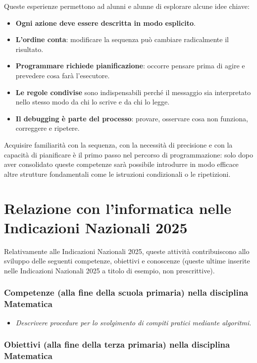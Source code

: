 Queste esperienze permettono ad alunni e alunne di esplorare alcune idee chiave:

\begin{itemize}
\item
  \textbf{Ogni azione deve essere descritta in modo esplicito}.
\item
  \textbf{L'ordine conta}: modificare la sequenza può cambiare radicalmente il risultato.
\item
  \textbf{Programmare richiede pianificazione}: occorre pensare prima di agire e prevedere cosa farà l'esecutore.
\item
  \textbf{Le regole condivise} sono indispensabili perché il messaggio sia interpretato nello stesso modo da chi lo scrive e da chi lo legge.
\item
  \textbf{Il debugging è parte del processo}: provare, osservare cosa non funziona, correggere e ripetere.
\end{itemize}

Acquisire familiarità con la sequenza, con la necessità di precisione e con la capacità di pianificare è il primo passo nel percorso di programmazione: solo dopo aver consolidato queste competenze sarà possibile introdurre in modo efficace altre strutture fondamentali come le istruzioni condizionali o le ripetizioni.

\section{Relazione con l'informatica nelle Indicazioni Nazionali 2025 }\label{relazione-con-linformatica-nelle-indicazioni-nazionali}

Relativamente alle Indicazioni Nazionali 2025, queste attività contribuiscono allo sviluppo delle seguenti competenze, obiettivi e conoscenze (queste ultime inserite nelle Indicazioni Nazionali 2025 a titolo di esempio, non prescrittive).


\subsubsection{Competenze (alla fine della scuola primaria) nella disciplina Matematica}


\begin{itemize}
\item
  \emph{Descrivere procedure per lo svolgimento di compiti pratici mediante algoritmi.}
\end{itemize}


\subsubsection{Obiettivi (alla fine della terza primaria) nella disciplina Matematica}


